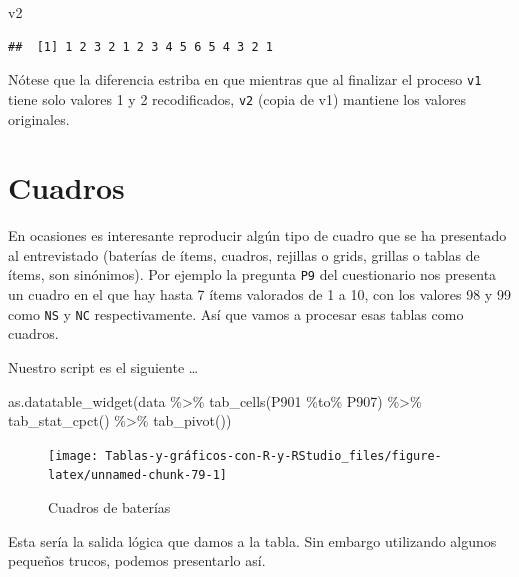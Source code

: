 \documentclass[
]{book}
\newenvironment{Shaded}{\begin{snugshade}}{\end{snugshade}}
\newcommand{\FunctionTok}[1]{\textcolor[rgb]{0.00,0.00,0.00}{#1}}
\newcommand{\NormalTok}[1]{#1}
\newcommand{\SpecialCharTok}[1]{\textcolor[rgb]{0.00,0.00,0.00}{#1}}
\begin{document}
\begin{Shaded}
\begin{Highlighting}[]
\NormalTok{v2}
\end{Highlighting}
\end{Shaded}

\begin{verbatim}
##  [1] 1 2 3 2 1 2 3 4 5 6 5 4 3 2 1
\end{verbatim}

Nótese que la diferencia estriba en que mientras que al finalizar el proceso \texttt{v1} tiene solo valores 1 y 2 recodificados, \texttt{v2} (copia de v1) mantiene los valores originales.

\hypertarget{cuadros}{%
\section{Cuadros}\label{cuadros}}

En ocasiones es interesante reproducir algún tipo de cuadro que se ha presentado al entrevistado (baterías de ítems, cuadros, rejillas o grids, grillas o tablas de ítems, son sinónimos). Por ejemplo la pregunta \texttt{P9} del cuestionario nos presenta un cuadro en el que hay hasta 7 ítems valorados de 1 a 10, con los valores 98 y 99 como \texttt{NS} y \texttt{NC} respectivamente. Así que vamos a procesar esas tablas como cuadros.

Nuestro script es el siguiente \ldots{}

\begin{Shaded}
\begin{Highlighting}[]
\FunctionTok{as.datatable\_widget}\NormalTok{(data }\SpecialCharTok{\%\textgreater{}\%} \FunctionTok{tab\_cells}\NormalTok{(P901 }\SpecialCharTok{\%to\%}\NormalTok{ P907) }\SpecialCharTok{\%\textgreater{}\%} 
  \FunctionTok{tab\_stat\_cpct}\NormalTok{() }\SpecialCharTok{\%\textgreater{}\%} \FunctionTok{tab\_pivot}\NormalTok{())}
\end{Highlighting}
\end{Shaded}

\begin{figure}[H]

{\centering \texttt{[image: Tablas-y-gráficos-con-R-y-RStudio\_files/figure-latex/unnamed-chunk-79-1]} 

}

\caption{Cuadros de baterías}\label{fig:unnamed-chunk-79}
\end{figure}

Esta sería la salida lógica que damos a la tabla. Sin embargo utilizando algunos pequeños trucos, podemos presentarlo así.
\end{document}
